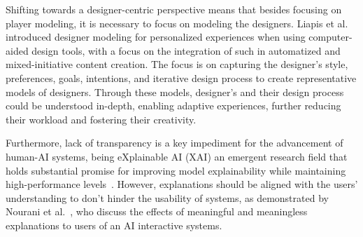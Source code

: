 
Shifting towards a designer-centric perspective means that besides focusing on player modeling, it is necessary to focus on modeling the designers. Liapis et al.~ introduced designer modeling for personalized experiences when using computer-aided design tools, with a focus on the integration of such in automatized and mixed-initiative content creation. The focus is on capturing the designer's style, preferences, goals, intentions, and iterative design process to create representative models of designers. Through these models, designer's and their design process could be understood in-depth, enabling adaptive experiences, further reducing their workload and fostering their creativity. 





Furthermore, lack of transparency is a key impediment for the advancement of human-AI systems, being eXplainable AI (XAI) an emergent research field that holds substantial promise for improving model explainability while maintaining high-performance levels~. However, explanations should be aligned with the users' understanding to don't hinder the usability of systems, as demonstrated by Nourani et al.~, who discuss the effects of meaningful and meaningless explanations to users of an AI interactive systems.

